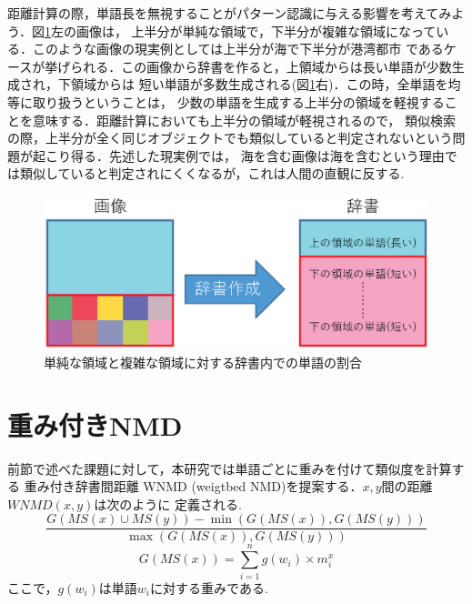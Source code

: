 距離計算の際，単語長を無視することがパターン認識に与える影響を考えてみよう．図\ref{fig:created_image.eps}左の画像は，
上半分が単純な領域で，下半分が複雑な領域になっている．このような画像の現実例としては上半分が海で下半分が港湾都市
であるケースが挙げられる．この画像から辞書を作ると，上領域からは長い単語が少数生成され，下領域からは
短い単語が多数生成される(図\ref{fig:created_image.eps}右)．この時，全単語を均等に取り扱うということは，
少数の単語を生成する上半分の領域を軽視することを意味する．距離計算においても上半分の領域が軽視されるので，
類似検索の際，上半分が全く同じオブジェクトでも類似していると判定されないという問題が起こり得る．先述した現実例では，
海を含む画像は海を含むという理由では類似していると判定されにくくなるが，これは人間の直観に反する.


%
%

\begin{figure}[tb]
\begin{center}
\includegraphics[clip, width=\columnwidth]{image/created_image_1.eps}
\caption{単純な領域と複雑な領域に対する辞書内での単語の割合}
\label{fig:created_image.eps}
\end{center}
\end{figure}
\section{重み付きNMD}
前節で述べた課題に対して，本研究では単語ごとに重みを付けて類似度を計算する
重み付き辞書間距離 WNMD (weigtbed NMD)を提案する．$x,y$間の距離$WNMD(x,y)$は次のように
定義される.
$$
\frac{G(MS(x) \cup MS(y)) - \min(G(MS(x)) , G(MS(y)))}{\max(G(MS(x)) , G(MS(y)))}
$$
\begin{equation}
G(MS(x)) = \sum_{i=1}^n g(w_i)\times m_i^x
\end{equation}
ここで，$g(w_i)$は単語$w_i$に対する重みである.

